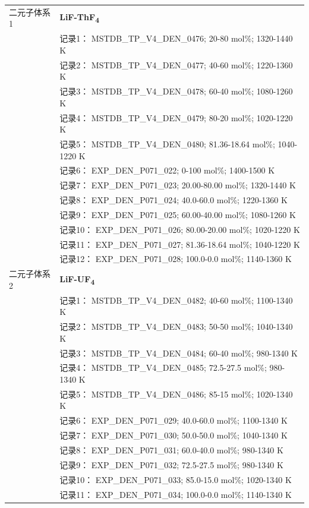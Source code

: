 \documentclass[12pt]{article}
\begin{document}
{\begin{longtable}[]{@{}
  >{\raggedright\arraybackslash}p{}
  >{\raggedright\arraybackslash}p{}@{}}
二元子体系 1  & \textbf{LiF-ThF\textsubscript{4}} \\
 & 记录1： MSTDB\_TP\_V4\_DEN\_0476; 20-80 mol\%; 1320-1440 K \\
 & 记录2： MSTDB\_TP\_V4\_DEN\_0477; 40-60 mol\%; 1220-1360 K \\
 & 记录3： MSTDB\_TP\_V4\_DEN\_0478; 60-40 mol\%; 1080-1260 K \\
 & 记录4： MSTDB\_TP\_V4\_DEN\_0479; 80-20 mol\%; 1020-1220 K \\
 & 记录5： MSTDB\_TP\_V4\_DEN\_0480; 81.36-18.64 mol\%; 1040-1220 K \\
 & 记录6： EXP\_DEN\_P071\_022; 0-100 mol\%; 1400-1500 K \\
 & 记录7： EXP\_DEN\_P071\_023; 20.00-80.00 mol\%; 1320-1440 K \\
 & 记录8： EXP\_DEN\_P071\_024; 40.0-60.0 mol\%; 1220-1360 K \\
 & 记录9： EXP\_DEN\_P071\_025; 60.00-40.00 mol\%; 1080-1260 K \\
 & 记录10： EXP\_DEN\_P071\_026; 80.00-20.00 mol\%; 1020-1220 K \\
 & 记录11： EXP\_DEN\_P071\_027; 81.36-18.64 mol\%; 1040-1220 K \\
 & 记录12： EXP\_DEN\_P071\_028; 100.0-0.0 mol\%; 1140-1360 K  \\

二元子体系 2  & \textbf{LiF-UF\textsubscript{4}} \\
 & 记录1： MSTDB\_TP\_V4\_DEN\_0482; 40-60 mol\%; 1100-1340 K \\
 & 记录2： MSTDB\_TP\_V4\_DEN\_0483; 50-50 mol\%; 1040-1340 K \\
 & 记录3： MSTDB\_TP\_V4\_DEN\_0484; 60-40 mol\%; 980-1340 K \\
 & 记录4： MSTDB\_TP\_V4\_DEN\_0485; 72.5-27.5 mol\%; 980-1340 K \\
 & 记录5： MSTDB\_TP\_V4\_DEN\_0486; 85-15 mol\%; 1020-1340 K \\
 & 记录6： EXP\_DEN\_P071\_029; 40.0-60.0 mol\%; 1100-1340 K \\
 & 记录7： EXP\_DEN\_P071\_030; 50.0-50.0 mol\%; 1040-1340 K \\
 & 记录8： EXP\_DEN\_P071\_031; 60.0-40.0 mol\%; 980-1340 K \\
 & 记录9： EXP\_DEN\_P071\_032; 72.5-27.5 mol\%; 980-1340 K \\
 & 记录10： EXP\_DEN\_P071\_033; 85.0-15.0 mol\%; 1020-1340 K \\
 & 记录11： EXP\_DEN\_P071\_034; 100.0-0.0 mol\%; 1140-1340 K  \\


\end{longtable}}
\end{document}
